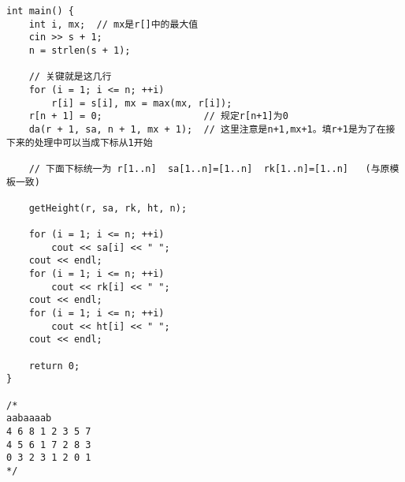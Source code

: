 \begin{lstlisting}
int main() {
    int i, mx;  // mx是r[]中的最大值
    cin >> s + 1;
    n = strlen(s + 1);

    // 关键就是这几行
    for (i = 1; i <= n; ++i)
        r[i] = s[i], mx = max(mx, r[i]);
    r[n + 1] = 0;                  // 规定r[n+1]为0
    da(r + 1, sa, n + 1, mx + 1);  // 这里注意是n+1,mx+1。填r+1是为了在接下来的处理中可以当成下标从1开始

    // 下面下标统一为 r[1..n]  sa[1..n]=[1..n]  rk[1..n]=[1..n]   (与原模板一致)

    getHeight(r, sa, rk, ht, n);

    for (i = 1; i <= n; ++i)
        cout << sa[i] << " ";
    cout << endl;
    for (i = 1; i <= n; ++i)
        cout << rk[i] << " ";
    cout << endl;
    for (i = 1; i <= n; ++i)
        cout << ht[i] << " ";
    cout << endl;

    return 0;
}

/*
aabaaaab
4 6 8 1 2 3 5 7
4 5 6 1 7 2 8 3
0 3 2 3 1 2 0 1
*/
\end{lstlisting}
